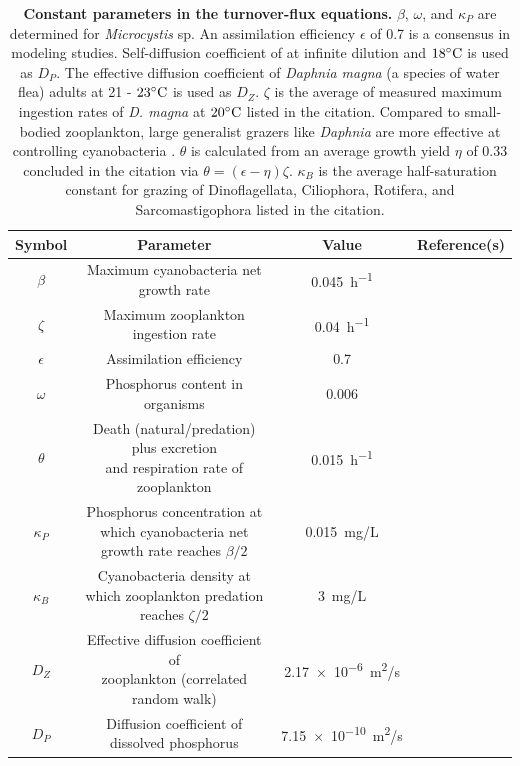 \documentclass{article}
\begin{document}
\begin{table}[H]
    \renewcommand{\arraystretch}{2}
    \caption{\textbf{Constant parameters in the turnover-flux equations.} $\beta$, $\omega$, and $\kappa_P$ are determined for \textit{Microcystis} sp. An assimilation efficiency $\epsilon$ of 0.7 is a consensus in modeling studies. Self-diffusion coefficient of  at infinite dilution and $18 \degree\text{C}$ is used as $D_P$. The effective diffusion coefficient of \textit{Daphnia magna} (a species of water flea) adults at 21 - $23 \degree \text{C}$ is used as $D_Z$. $\zeta$ is the average of measured maximum ingestion rates of \textit{D. magna} at $20 \degree\text{C}$ listed in the citation. Compared to small-bodied zooplankton, large generalist grazers like \textit{Daphnia} are more effective at controlling cyanobacteria \cite{GrazerSize}. $\theta$ is calculated from an average growth yield $\eta$ of 0.33 concluded in the citation via $\theta = (\epsilon - \eta)\zeta$. $\kappa_B$ is the average half-saturation constant for grazing of Dinoflagellata, Ciliophora, Rotifera, and Sarcomastigophora listed in the citation.}
    \label{Parameters}
    \centering
    \begin{tabular}{c c c c}
        \hline
        Symbol & Parameter & Value & Reference(s) \\
        \hline
        $\beta$ & Maximum cyanobacteria net growth rate & \SI{0.045}{h^{-1}} & \cite{B}\\
        $\zeta$ & Maximum zooplankton ingestion rate & \SI{0.04}{h^{-1}} & \cite{Zeta}\\
        $\epsilon$ & Assimilation efficiency & 0.7 & \cite{Assimilation}\\
        $\omega$ & Phosphorus content in organisms & 0.006 & \cite{MicrocystisPContent}\\
        $\theta$ & \makecell{Death (natural/predation) plus excretion\\and respiration rate of zooplankton} & \SI{0.015}{h^{-1}} & \cite{Zeta}\\
        $\kappa_P$ & \makecell{Phosphorus concentration at which\\cyanobacteria net growth rate reaches $\beta/2$} & \SI{0.015}{mg/L} & \cite{B}\\
        $\kappa_B$ & \makecell{Cyanobacteria density at which\\zooplankton predation reaches $\zeta/2$}& \SI{3}{mg/L} & \cite{KappaBmeta}\\
        $D_Z$ & \makecell{Effective diffusion coefficient of\\zooplankton (correlated random walk)} & \SI{2.17e-6}{m^2/s} & \cite{DZTheory, DZExperiment} \\
        $D_P$ & Diffusion coefficient of dissolved phosphorus & \SI{7.15e-10}{m^2/s} & \cite{DP} \\
        \hline
    \end{tabular}
\end{table}
\end{document}
